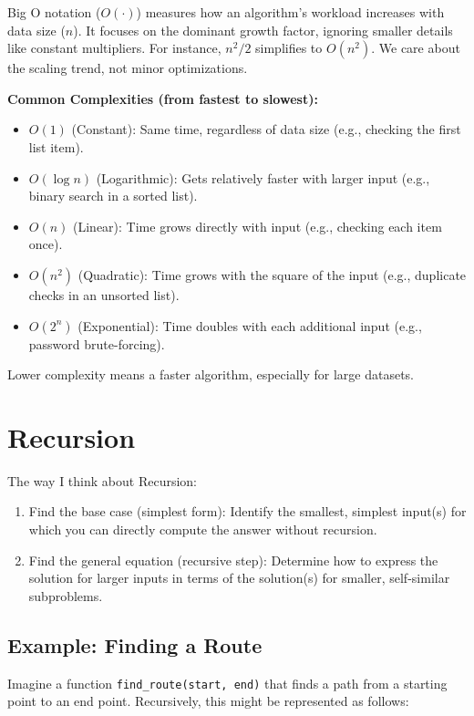 \documentclass[12pt, a4paper]{article}
\begin{document}
Big O notation ($O(\cdot)$) measures how an algorithm's workload increases with data size ($n$).  It focuses on the dominant growth factor, ignoring smaller details like constant multipliers.  For instance, $n^2/2$ simplifies to $O(n^2)$. We care about the scaling trend, not minor optimizations.

\textbf{Common Complexities (from fastest to slowest):}
\begin{itemize}[noitemsep] %
    \item $O(1)$ (Constant):  Same time, regardless of data size (e.g., checking the first list item).
    \item $O(\log n)$ (Logarithmic): Gets relatively faster with larger input (e.g., binary search in a sorted list).
    \item $O(n)$ (Linear): Time grows directly with input (e.g., checking each item once).
    \item $O(n^2)$ (Quadratic): Time grows with the square of the input (e.g., duplicate checks in an unsorted list).
    \item $O(2^n)$ (Exponential): Time doubles with each additional input (e.g., password brute-forcing).
\end{itemize}

Lower complexity means a faster algorithm, especially for large datasets.

\section{Recursion}
The way I think about Recursion:
\begin{enumerate}
    \item Find the base case (simplest form): Identify the smallest, simplest input(s) for which you can directly compute the answer without recursion.
    \item Find the general equation (recursive step): Determine how to express the solution for larger inputs in terms of the solution(s) for smaller, self-similar subproblems.
\end{enumerate}

\subsection{Example: Finding a Route}

Imagine a function \texttt{find\_route(start, end)} that finds a path from a starting point to an end point. Recursively, this might be represented as follows:
\end{document}
